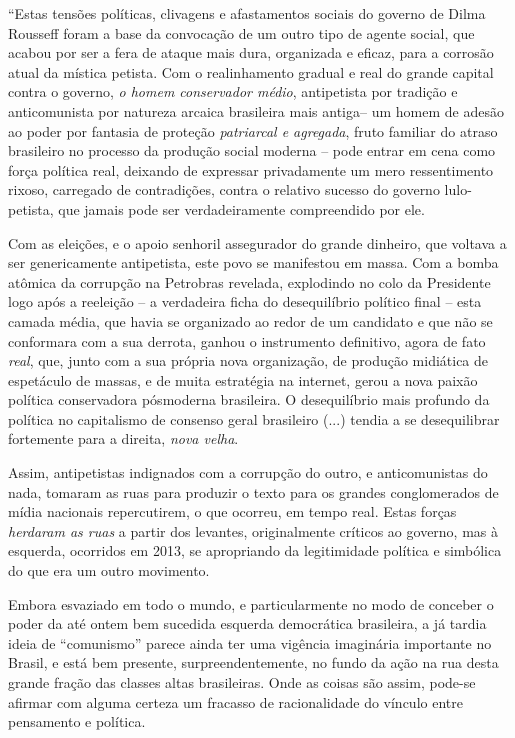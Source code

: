``Estas tensões políticas, clivagens e afastamentos sociais do governo
de Dilma Rousseff foram a base da convocação de um outro tipo de agente
social, que acabou por ser a fera de ataque mais dura, organizada e
eficaz, para a corrosão atual da mística petista. Com o realinhamento
gradual e real do grande capital contra o governo, \emph{o homem
conservador médio}, antipetista por tradição e anticomunista por
natureza arcaica brasileira mais antiga-- um homem de adesão ao poder
por fantasia de proteção \emph{patriarcal e agregada}, fruto familiar do
atraso brasileiro no processo da produção social moderna -- pode entrar
em cena como força política real, deixando de expressar privadamente um
mero ressentimento rixoso, carregado de contradições, contra o relativo
sucesso do governo lulo-petista, que jamais pode ser verdadeiramente
compreendido por ele.

Com as eleições, e o apoio senhoril assegurador do grande dinheiro, que
voltava a ser genericamente antipetista, este povo se manifestou em
massa. Com a bomba atômica da corrupção na Petrobras revelada,
explodindo no colo da Presidente logo após a reeleição -- a verdadeira
ficha do desequilíbrio político final -- esta camada média, que havia se
organizado ao redor de um candidato e que não se conformara com a sua
derrota, ganhou o instrumento definitivo, agora de fato \emph{real},
que, junto com a sua própria nova organização, de produção midiática de
espetáculo de massas, e de muita estratégia na internet, gerou a nova
paixão política conservadora pósmoderna brasileira. O desequilíbrio mais
profundo da política no capitalismo de consenso geral brasileiro (...)
tendia a se desequilibrar fortemente para a direita, \emph{nova velha}.

Assim, antipetistas indignados com a corrupção do outro, e
anticomunistas do nada, tomaram as ruas para produzir o texto para os
grandes conglomerados de mídia nacionais repercutirem, o que ocorreu, em
tempo real. Estas forças \emph{herdaram as ruas} a partir dos levantes,
originalmente críticos ao governo, mas à esquerda, ocorridos em 2013, se
apropriando da legitimidade política e simbólica do que era um outro
movimento.

Embora esvaziado em todo o mundo, e particularmente no modo de conceber
o poder da até ontem bem sucedida esquerda democrática brasileira, a já
tardia ideia de ``comunismo'' parece ainda ter uma vigência imaginária
importante no Brasil, e está bem presente, surpreendentemente, no fundo
da ação na rua desta grande fração das classes altas brasileiras. Onde
as coisas são assim, pode-se afirmar com alguma certeza um fracasso de
racionalidade do vínculo entre pensamento e política.

